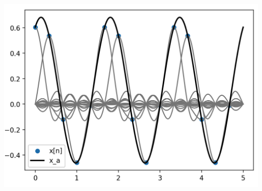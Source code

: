 \begin{listing}
    \begin{minipage}{0.49\textwidth}
        \strut\vspace*{-\baselineskip}\newline
        \inputminted[firstline=4]{python3}{code/sampling_theorem.py}
    \end{minipage}
    \begin{minipage}{0.49\textwidth}
        \strut\vspace*{-\baselineskip}\newline
        \includegraphics[width=\textwidth]{code/sampling_theorem.png}
    \end{minipage}
    \label{py:sampling_theorem}
\end{listing}

\FloatBarrier
